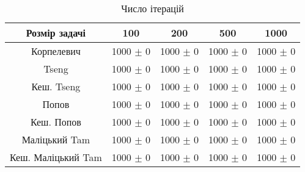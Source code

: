 \begin{table}[H]
	\centering
	\begin{tabular}{|c||c|c|c|c|}\hline
		Розмір задачі & 100 & 200 & 500 & 1000 \\ \hline \hline
		Корпелевич & 1000 $\pm$ 0 & 1000 $\pm$ 0 & 1000 $\pm$ 0 & 1000 $\pm$ 0 \\ \hline
		Tseng & 1000 $\pm$ 0 & 1000 $\pm$ 0 & 1000 $\pm$ 0 & 1000 $\pm$ 0 \\ \hline
		Кеш. Tseng & 1000 $\pm$ 0 & 1000 $\pm$ 0 & 1000 $\pm$ 0 & 1000 $\pm$ 0 \\ \hline
		Попов & 1000 $\pm$ 0 & 1000 $\pm$ 0 & 1000 $\pm$ 0 & 1000 $\pm$ 0 \\ \hline
		Кеш. Попов & 1000 $\pm$ 0 & 1000 $\pm$ 0 & 1000 $\pm$ 0 & 1000 $\pm$ 0 \\ \hline
		Маліцький Tam & 1000 $\pm$ 0 & 1000 $\pm$ 0 & 1000 $\pm$ 0 & 1000 $\pm$ 0 \\ \hline
		Кеш. Маліцький Tam & 1000 $\pm$ 0 & 1000 $\pm$ 0 & 1000 $\pm$ 0 & 1000 $\pm$ 0 \\ \hline
	\end{tabular}
	\caption{Число ітерацій}
\end{table}
